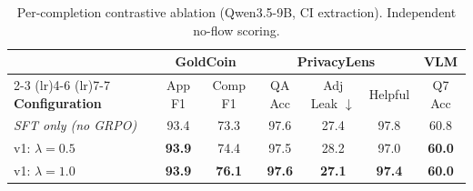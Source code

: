 \begin{table}[ht]
\centering
\caption{Per-completion contrastive ablation (Qwen3.5-9B, CI extraction). Independent no-flow scoring.}
\label{tab:grpo-v1}
\begin{tabular}{lcccccc}
\toprule
 & \multicolumn{2}{c}{\textbf{GoldCoin}} & \multicolumn{3}{c}{\textbf{PrivacyLens}} & \multicolumn{1}{c}{\textbf{VLM}} \\
\cmidrule(lr){2-3} \cmidrule(lr){4-6} \cmidrule(lr){7-7}
\textbf{Configuration} & App F1 & Comp F1 & QA Acc & Adj Leak $\downarrow$ & Helpful & Q7 Acc \\
\midrule
\textit{SFT only (no GRPO)} & 93.4 & 73.3 & 97.6 & 27.4 & 97.8 & 60.8 \\
\midrule
v1: $\lambda=0.5$ & \textbf{93.9} & 74.4 & 97.5 & 28.2 & 97.0 & \textbf{60.0} \\
v1: $\lambda=1.0$ & \textbf{93.9} & \textbf{76.1} & \textbf{97.6} & \textbf{27.1} & \textbf{97.4} & \textbf{60.0} \\
\bottomrule
\end{tabular}
\end{table}